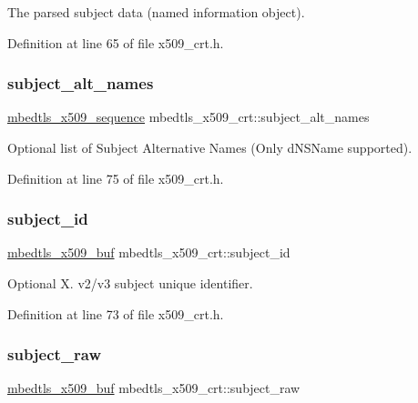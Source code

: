 The parsed subject data (named information object). 

Definition at line 65 of file x509\+\_\+crt.\+h.

\mbox{\label{structmbedtls__x509__crt_a1f148e8fb52e03e2604e716386a07df4}} 
\subsubsection{\texorpdfstring{subject\+\_\+alt\+\_\+names}{subject\_alt\_names}}
{\footnotesize\ttfamily \mbox{\hyperlink{group__x509__module_gabd52d60a09315854d9ef849d02154f35}{mbedtls\+\_\+x509\+\_\+sequence}} mbedtls\+\_\+x509\+\_\+crt\+::subject\+\_\+alt\+\_\+names}

Optional list of Subject Alternative Names (Only d\+N\+S\+Name supported). 

Definition at line 75 of file x509\+\_\+crt.\+h.

\mbox{\label{structmbedtls__x509__crt_adbbaba207a103a73f41b4b72ffc540f5}} 
\subsubsection{\texorpdfstring{subject\+\_\+id}{subject\_id}}
{\footnotesize\ttfamily \mbox{\hyperlink{group__x509__module_ga4d02c9e8e4e2934555e0d132cd2976dc}{mbedtls\+\_\+x509\+\_\+buf}} mbedtls\+\_\+x509\+\_\+crt\+::subject\+\_\+id}

Optional X. v2/v3 subject unique identifier. 

Definition at line 73 of file x509\+\_\+crt.\+h.

\mbox{\label{structmbedtls__x509__crt_ac30aeab20c2cdf74dae631d6d0691651}} 
\subsubsection{\texorpdfstring{subject\+\_\+raw}{subject\_raw}}
{\footnotesize\ttfamily \mbox{\hyperlink{group__x509__module_ga4d02c9e8e4e2934555e0d132cd2976dc}{mbedtls\+\_\+x509\+\_\+buf}} mbedtls\+\_\+x509\+\_\+crt\+::subject\+\_\+raw}


